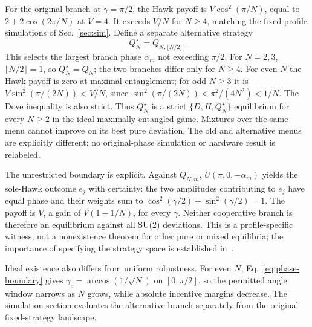 For the original branch at $\gamma=\pi/2$, the Hawk payoff is
$V\cos^2(\pi/N)$, equal to $2+2\cos(2\pi/N)$ at $V=4$.
It exceeds $V/N$ for $N\ge4$, matching the fixed-profile simulations of
Sec.~\ref{sec:sim}. Define a separate alternative strategy
\begin{equation}
Q_N^\star=Q_{N,\lfloor N/2\rfloor}.
\label{eq:alternative-phase}
\end{equation}
This selects the largest branch phase $\alpha_m$ not exceeding $\pi/2$.
For $N=2,3$, $\lfloor N/2\rfloor=1$, so $Q_N^\star=Q_N$; the two branches
differ only for $N\ge4$.
For even $N$ the Hawk payoff is zero at maximal entanglement; for odd
$N\ge3$ it is $V\sin^2(\pi/(2N))<V/N$, since
$\sin^2(\pi/(2N))<\pi^2/(4N^2)<1/N$.
The Dove inequality is also strict. Thus $Q_N^\star$ is a strict
$\{D,H,Q_N^\star\}$ equilibrium for every $N\ge2$ in the ideal
maximally entangled game. Mixtures over the same menu cannot improve on
its best pure deviation. The old and alternative menus are explicitly
different; no original-phase simulation or hardware result is relabeled.

The unrestricted boundary is explicit. Against $Q_{N,m}$,
$U(\pi,0,-\alpha_m)$ yields the sole-Hawk outcome $e_j$ with certainty:
the two amplitudes contributing to $e_j$ have equal phase and their
weights sum to $\cos^2(\gamma/2)+\sin^2(\gamma/2)=1$.
The payoff is $V$, a gain of $V(1-1/N)$, for every $\gamma$.
Neither cooperative branch is therefore an equilibrium against all SU(2)
deviations. This is a profile-specific witness, not a nonexistence theorem
for other pure or mixed equilibria; the importance of specifying the
strategy space is established in~\cite{benjamin2001comment}.

Ideal existence also differs from uniform robustness. For even $N$,
Eq.~\eqref{eq:phase-boundary} gives
$\gamma_c=\arccos(1/\sqrt N)$ on $[0,\pi/2]$, so the permitted angle
window narrows as $N$ grows, while absolute incentive margins decrease.
The simulation section evaluates the alternative branch separately from
the original fixed-strategy landscape.
